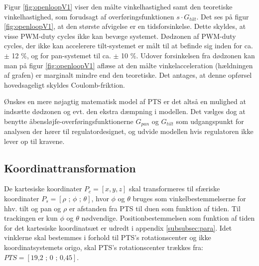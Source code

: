 Figur \ref{fig:openloopV1} viser den målte vinkelhastighed samt den teoretiske vinkelhastighed,
som forudsagt af overføringsfunktionen \(s\cdot{}G_{tilt}\).
Det ses på figur \ref{fig:openloopV1}, at den største afvigelse er en tidsforsinkelse.
Dette skyldes, at visse PWM-duty cycles ikke kan bevæge systemet.
Dødzonen af PWM-duty cycles, der ikke kan accelerere tilt-systemet er målt til at befinde sig inden for
ca. \(\pm\) 12 \%, og for pan-systemet til ca. \(\pm\) 10 \%.
Udover forsinkelsen fra dødzonen kan man på figur \ref{fig:openloopV1} aflæse
at den målte vinkelacceleration (hældningen af grafen) er marginalt mindre end den teoretiske.
Det antages, at denne opførsel hovedsageligt skyldes Coulomb-friktion.

Ønskes en mere nøjagtig matematisk model af PTS
er det altså en mulighed at indsætte dødzonen og evt. den ekstra dæmpning i modellen.
Det vælges dog at benytte åbensløjfe-overføringsfunktionerne \(G_{pan}\) og \(G_{tilt}\)
som udgangspunkt for analysen der hører til regulatordesignet,
og udvide modellen hvis regulatoren ikke lever op til kravene.

\subsection{Koordinattransformation}
\label{sec:koordinattransformation}
De kartesiske koordinater \(P_c=\left[x, y, z\right]\) skal transformeres til sfæriske koordinater
\(P_s=\left[\rho \text{ ; } \phi \text{ ; } \theta\right]\), hvor \(\phi\) og \(\theta\) bruges
som vinkelbestemmelserne for hhv. tilt og pan og \(\rho\) er afstanden fra PTS til duen som funktion af tiden.
Til trackingen er kun \(\phi\) og \(\theta\) nødvendige.
Positionbestemmelsen som funktion af tiden for det kartesiske koordinatsæt er udredt i appendix \ref{subsubsec:para}.
Idet vinklerne skal bestemmes i forhold til PTS's rotationscenter og ikke koordinatsystemets origo, skal PTS's rotationscenter trækkes fra:
\(PTS=[\text{19,2 ; 0 ; 0,45}]\). 

